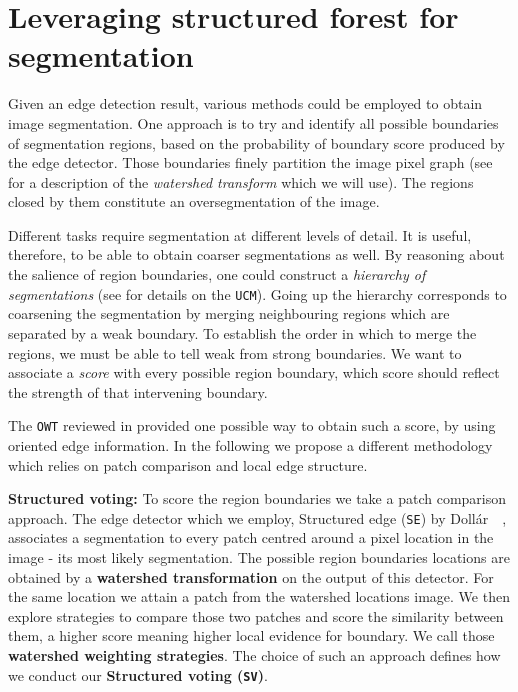 \chapter{Leveraging structured forest for segmentation}
\label{Chapter4}
Given an edge detection result, various methods could be employed to obtain image segmentation.  One approach is to try and identify all possible boundaries of segmentation regions, based on the probability of boundary score produced by the edge detector. Those boundaries %
finely partition the image pixel graph (see  for a description of the \textit{watershed transform} which we will use). The regions closed by them constitute an oversegmentation of the image. 

Different tasks require segmentation at different levels of detail. It is useful, therefore, to be able to obtain coarser segmentations as well. 
By reasoning about the salience of region boundaries, one could construct a \textit{hierarchy of segmentations} (see  for details on the {\tt UCM}). Going up the hierarchy corresponds to coarsening the segmentation by merging neighbouring regions which are separated by a weak boundary. To establish the order in which to merge the regions, we must be able to tell weak from strong boundaries. We want to associate a \textit{score} with every possible region boundary, which score should reflect the strength of that intervening boundary.

The {\tt OWT} reviewed in  provided one possible way to obtain such a score, by using oriented edge information. In the following we propose a different methodology which relies on patch comparison and local edge structure.

\textbf{Structured voting:} To score the region boundaries we take a patch comparison approach. The edge detector which we employ, Structured edge ({\tt SE}) by Doll\'ar~\etal~\cite{DollarICCV13edges}, associates a segmentation to every patch centred around a pixel location in the image - its most likely segmentation. The possible region boundaries locations are obtained by a {\bf watershed transformation} on the output of this detector. For the same location we attain a patch from the watershed locations image. We then explore strategies to compare those two patches and score the similarity between them, a higher score meaning higher local evidence for boundary. We call those {\bf watershed weighting strategies}. The choice of such an approach defines how we conduct our \textbf{Structured voting ({\tt SV})}.


